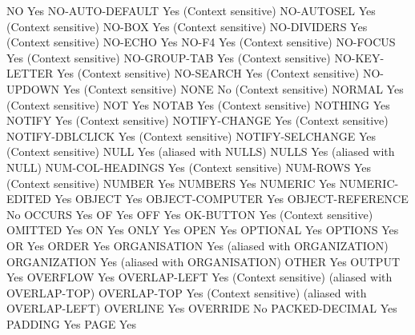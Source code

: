 NO                              Yes
NO-AUTO-DEFAULT                 Yes (Context sensitive)
NO-AUTOSEL                      Yes (Context sensitive)
NO-BOX                          Yes (Context sensitive)
NO-DIVIDERS                     Yes (Context sensitive)
NO-ECHO                         Yes
NO-F4                           Yes (Context sensitive)
NO-FOCUS                        Yes (Context sensitive)
NO-GROUP-TAB                    Yes (Context sensitive)
NO-KEY-LETTER                   Yes (Context sensitive)
NO-SEARCH                       Yes (Context sensitive)
NO-UPDOWN                       Yes (Context sensitive)
NONE                            No (Context sensitive)
NORMAL                          Yes (Context sensitive)
NOT                             Yes
NOTAB                           Yes (Context sensitive)
NOTHING                         Yes
NOTIFY                          Yes (Context sensitive)
NOTIFY-CHANGE                   Yes (Context sensitive)
NOTIFY-DBLCLICK                 Yes (Context sensitive)
NOTIFY-SELCHANGE                Yes (Context sensitive)
NULL                            Yes (aliased with NULLS)
NULLS                           Yes (aliased with NULL)
NUM-COL-HEADINGS                Yes (Context sensitive)
NUM-ROWS                        Yes (Context sensitive)
NUMBER                          Yes
NUMBERS                         Yes
NUMERIC                         Yes
NUMERIC-EDITED                  Yes
OBJECT                          Yes
OBJECT-COMPUTER                 Yes
OBJECT-REFERENCE                No
OCCURS                          Yes
OF                              Yes
OFF                             Yes
OK-BUTTON                       Yes (Context sensitive)
OMITTED                         Yes
ON                              Yes
ONLY                            Yes
OPEN                            Yes
OPTIONAL                        Yes
OPTIONS                         Yes
OR                              Yes
ORDER                           Yes
ORGANISATION                    Yes (aliased with ORGANIZATION)
ORGANIZATION                    Yes (aliased with ORGANISATION)
OTHER                           Yes
OUTPUT                          Yes
OVERFLOW                        Yes
OVERLAP-LEFT                    Yes (Context sensitive) (aliased with OVERLAP-TOP)
OVERLAP-TOP                     Yes (Context sensitive) (aliased with OVERLAP-LEFT)
OVERLINE                        Yes
OVERRIDE                        No
PACKED-DECIMAL                  Yes
PADDING                         Yes
PAGE                            Yes
